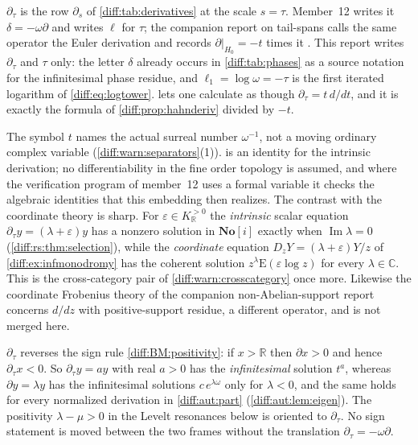 \documentclass[11pt,letterpaper]{article}
\numberwithin{equation}{section}
\theoremstyle{definition}
\theoremstyle{remark}
\newcommand{\SC}{\mathbf{No}[i]}
\newcommand{\R}{\mathbb R}
\newcommand{\C}{\mathbb C}
\newcommand{\der}{\partial}
\newcommand{\Imm}{\operatorname{Im}}
\newcommand{\Emm}{\mathrm{E}}
\newcommand{\Dz}{D_{z}}
\newcommand{\derT}{\der_{\tau}}
\newcommand{\KR}{K_{\R}}
\begin{document}
\begin{remark}
\label{diff:rs:rem:names}
$\derT$ is the row $\der_{s}$ of \cref{diff:tab:derivatives} at the scale
$s=\tau$. Member~12 writes it $\delta=-\omega\der$ and writes $\ell$ for
$\tau$; the companion report on tail-spans calls the same operator the Euler
derivation and records $\der|_{H_{0}}=-t$ times it \cite{RepoTailSpans}. This
report writes $\derT$ and $\tau$ only: the letter $\delta$ already occurs in
\cref{diff:tab:phases} as a source notation for the infinitesimal phase
residue, and $\ell_{1}=\log\omega=-\tau$ is the first iterated logarithm of
\cref{diff:eq:logtower}.  lets one calculate
as though $\derT=t\,d/dt$, and it is exactly the formula of
\cref{diff:prop:hahnderiv} divided by $-t$.
\end{remark}

\begin{remark}
\label{diff:rs:rem:notcoordinate}
The symbol $t$ names the actual surreal number $\omega^{-1}$, not a moving
ordinary complex variable (\cref{diff:warn:separators}(1)).
 is an identity for the intrinsic derivation; no
differentiability in the fine order topology is assumed, and where the
verification program of member~12 uses a formal variable it checks the
algebraic identities that this embedding then realizes. The contrast with the
coordinate theory is sharp. For $\varepsilon\in\KR^{>0}$ the \emph{intrinsic}
scalar equation $\derT y=(\lambda+\varepsilon)y$ has a nonzero solution in
$\SC$ exactly when $\Imm\lambda=0$ (\cref{diff:rs:thm:selection}), while the
\emph{coordinate} equation $\Dz Y=(\lambda+\varepsilon)Y/z$ of
\cref{diff:ex:infmonodromy} has the coherent solution
$z^{\lambda}\Emm(\varepsilon\log z)$ for every $\lambda\in\C$. This is the
cross-category pair of \cref{diff:warn:crosscategory} once more. Likewise the
coordinate Frobenius theory of the companion non-Abelian-support report
concerns $d/dz$ with positive-support residue, a different operator, and is
not merged here.
\end{remark}

\begin{warning}[Orientation]
\label{diff:rs:warn:orientation}
$\derT$ reverses the sign rule \ref{diff:BM:positivity}: if $x>\R$ then
$\der x>0$ and hence $\derT x<0$. So $\derT y=ay$ with real $a>0$ has the
\emph{infinitesimal} solution $t^{a}$, whereas $\der y=\lambda y$ has the
infinitesimal solutions $c\,e^{\lambda\omega}$ only for $\lambda<0$, and the
same holds for every normalized derivation in \cref{diff:aut:part}
(\cref{diff:aut:lem:eigen}). The positivity $\lambda-\mu>0$ in the Levelt
resonances below is oriented to $\derT$. No sign statement is moved between the
two frames without the translation $\derT=-\omega\der$.
\end{warning}
\end{document}
